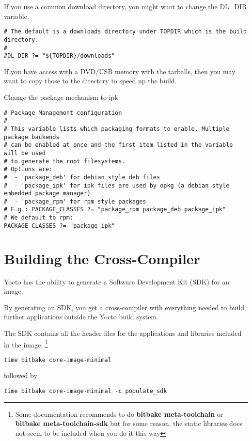 If you use a common download directory, you might want to  change the DL\_DIR variable.

\begin{verbatim}
# The default is a downloads directory under TOPDIR which is the build directory.
#
#DL_DIR ?= "${TOPDIR}/downloads"
\end{verbatim}

If you have access with a DVD/USB memory with the tarballs, then you may
want to copy those to the  directory to speed up the build.

Change the package mechanism to ipk


\begin{verbatim}
# Package Management configuration
#
# This variable lists which packaging formats to enable. Multiple package backends 
# can be enabled at once and the first item listed in the variable will be used 
# to generate the root filesystems.
# Options are:
#  - 'package_deb' for debian style deb files
#  - 'package_ipk' for ipk files are used by opkg (a debian style embedded package manager)
#  - 'package_rpm' for rpm style packages
# E.g.: PACKAGE_CLASSES ?= "package_rpm package_deb package_ipk"
# We default to rpm:
PACKAGE_CLASSES ?= "package_ipk"
\end{verbatim}


\clearpage
\section{Building the Cross-Compiler}

Yocto has the ability to generate a Software Development Kit (SDK) for an image.

By generating an SDK, you get a cross-compiler with everything needed to build 
further applications outside the Yocto build system.

The SDK contains all the header files for the applications and libraries included in the image. 
\footnote{Some documentation recommends to do {\bf bitbake meta-toolchain} or {\bf bitbake meta-toolchain-sdk}
but for some reason, the static libraries does not seem to be included when you do it this way}

\begin{verbatim}
time bitbake core-image-minimal
\end{verbatim}

followed by

\begin{verbatim}
time bitbake core-image-minimal -c populate_sdk
\end{verbatim}

